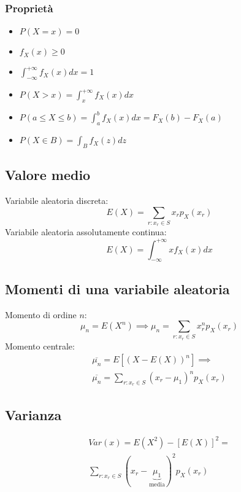 \begin{multicols*}{2}
\subsubsection*{Proprietà}
\begin{itemize}
    \item $P(X = x) = 0$
    \item $f_X(x) \ge 0$
    \item $\displaystyle \int_{-\infty}^{+\infty}f_X(x)dx=1$
    \item $P(X > x) = \displaystyle \int_{x}^{+\infty}f_X(x)dx$
    \item $P(a \le X \le b) = \displaystyle \int_{a}^{b}f_X(x)dx=F_X(b)-F_X(a)$
    \item $P(X \in B) = \displaystyle \int_{B}f_X(z)dz$
\end{itemize}

\subsection*{Valore medio}
Variabile aleatoria discreta:
$$
E(X) = \sum_{r: x_r \in S}x_r p_X(x_r)
$$
Variabile aleatoria assolutamente continua:
$$
E(X) = \int_{-\infty}^{+\infty}x f_X(x)dx
$$

\subsection*{Momenti di una variabile aleatoria}
Momento di ordine $n$:
$$
\mu_n = E(X^n) \implies \mu_n=\sum_{r: x_r \in S}x_r^n p_X(x_r)
$$
Momento centrale:
\begin{align*}
\overline{\mu_n} = E[(X-E(X))^n] \implies
\\\overline{\mu_n}=\sum_{r: x_r \in S}(x_r-\mu_1)^n p_X(x_r)
\end{align*}

\subsection*{Varianza}
\begin{align*}
\mathit{Var}(x) = E(X^2) - [E(X)]^2 =
\\\sum_{r: x_r \in S}(x_r - \underbrace{\mu_1}_{\text{media}})^2 p_X(x_r)
\end{align*}


\end{multicols*}
